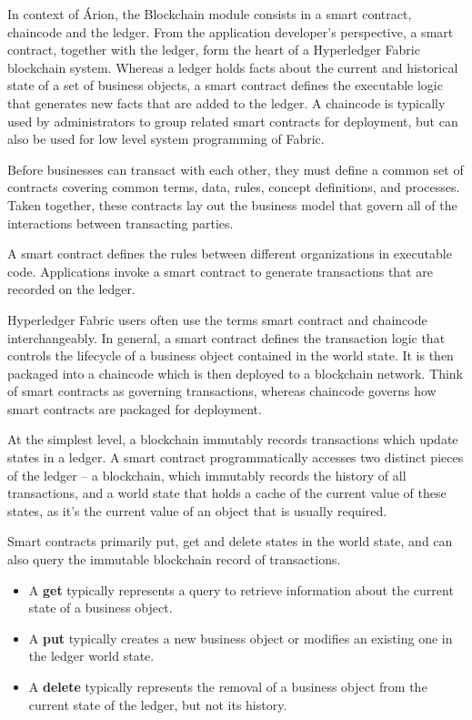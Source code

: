 In context of Árion, the Blockchain module consists in a smart contract, chaincode and the ledger. From the application developer’s perspective, a smart contract, together with the ledger, form the heart of a Hyperledger Fabric blockchain system. Whereas a ledger holds facts about the current and historical state of a set of business objects, a smart contract defines the executable logic that generates new facts that are added to the ledger. A chaincode is typically used by administrators to group related smart contracts for deployment, but can also be used for low level system programming of Fabric.

Before businesses can transact with each other, they must define a common set of contracts covering common terms, data, rules, concept definitions, and processes. Taken together, these contracts lay out the business model that govern all of the interactions between transacting parties.

A smart contract defines the rules between different organizations in executable code. Applications invoke a smart contract to generate transactions that are recorded on the ledger.

Hyperledger Fabric users often use the terms smart contract and chaincode interchangeably. In general, a smart contract defines the transaction logic that controls the lifecycle of a business object contained in the world state. It is then packaged into a chaincode which is then deployed to a blockchain network. Think of smart contracts as governing transactions, whereas chaincode governs how smart contracts are packaged for deployment.

At the simplest level, a blockchain immutably records transactions which update states in a ledger. A smart contract programmatically accesses two distinct pieces of the ledger – a blockchain, which immutably records the history of all transactions, and a world state that holds a cache of the current value of these states, as it’s the current value of an object that is usually required.

Smart contracts primarily put, get and delete states in the world state, and can also query the immutable blockchain record of transactions.

\begin{itemize}
\item A \textbf{get} typically represents a query to retrieve information about the current state of a business object.
\item A \textbf{put} typically creates a new business object or modifies an existing one in the ledger world state.
\item A \textbf{delete} typically represents the removal of a business object from the current state of the ledger, but not its history.
\end{itemize}

